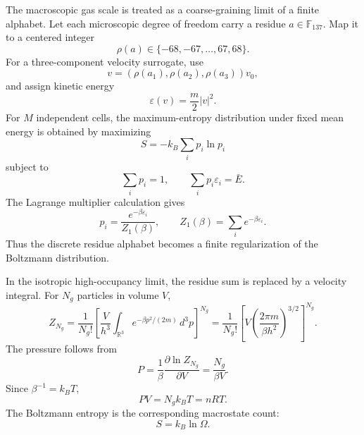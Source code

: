 \documentclass[11pt]{article}
\begin{document}
The macroscopic gas scale is treated as a coarse-graining limit of a finite
alphabet.  Let each microscopic degree of freedom carry a residue
$a\in\mathbb{F}_{137}$.  Map it to a centered integer
\begin{equation}
    \rho(a)\in\{-68,-67,\ldots,67,68\}.
\end{equation}
For a three-component velocity surrogate, use
\begin{equation}
    v=(\rho(a_1),\rho(a_2),\rho(a_3))v_0,
\end{equation}
and assign kinetic energy
\begin{equation}
    \varepsilon(v)=\frac{m}{2}|v|^2.
\end{equation}
For $M$ independent cells, the maximum-entropy distribution under fixed mean
energy is obtained by maximizing
\begin{equation}
    S=-k_B\sum_i p_i\ln p_i
\end{equation}
subject to
\begin{equation}
    \sum_i p_i=1,\qquad \sum_i p_i\varepsilon_i=\bar{E}.
\end{equation}
The Lagrange multiplier calculation gives
\begin{equation}
    p_i=\frac{e^{-\beta\varepsilon_i}}{Z_1(\beta)},
    \qquad
    Z_1(\beta)=\sum_i e^{-\beta\varepsilon_i}.
\end{equation}
Thus the discrete residue alphabet becomes a finite regularization of the
Boltzmann distribution.

In the isotropic high-occupancy limit, the residue sum is replaced by a
velocity integral.  For $N_g$ particles in volume $V$,
\begin{equation}
    Z_{N_g}
    =
    \frac{1}{N_g!}
    \left[
        \frac{V}{h^3}
        \int_{\mathbb{R}^3}e^{-\beta p^2/(2m)}\,d^3p
    \right]^{N_g}
    =
    \frac{1}{N_g!}
    \left[
        V\left(\frac{2\pi m}{\beta h^2}\right)^{3/2}
    \right]^{N_g}.
\end{equation}
The pressure follows from
\begin{equation}
    P=\frac{1}{\beta}\frac{\partial \ln Z_{N_g}}{\partial V}
      =
    \frac{N_g}{\beta V}.
\end{equation}
Since $\beta^{-1}=k_BT$,
\begin{equation}
    PV=N_gk_BT=nRT.
\end{equation}
The Boltzmann entropy is the corresponding macrostate count:
\begin{equation}
    S=k_B\ln\Omega.
\end{equation}
\end{document}
